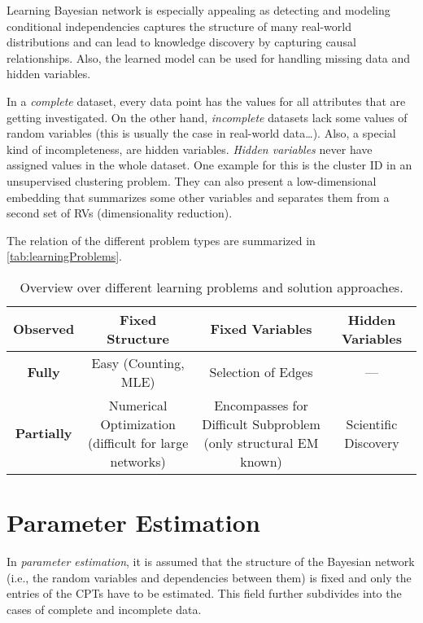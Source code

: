 	Learning Bayesian network is especially appealing as detecting and modeling conditional independencies captures the structure of many real-world distributions and can lead to knowledge discovery by capturing causal relationships. Also, the learned model can be used for handling missing data and hidden variables.

	In a \emph{complete} dataset, every data point has the values for all attributes that are getting investigated. On the other hand, \emph{incomplete} datasets lack some values of random variables (this is usually the case in real-world data\dots). Also, a special kind of incompleteness, are hidden variables. \emph{Hidden variables} never have assigned values in the whole dataset. One example for this is the cluster ID in an unsupervised clustering problem. They can also present a low-dimensional embedding that summarizes some other variables and separates them from a second set of RVs (dimensionality reduction).

	The relation of the different problem types are summarized in \autoref{tab:learningProblems}.

	\begin{table}
		\centering
		\begin{tabular}{c|ccc}
			\toprule
			\textbf{Observed} & \textbf{Fixed Structure} & \textbf{Fixed Variables} & \textbf{Hidden Variables} \\ \midrule
			\textbf{Fully} & Easy (Counting, MLE) & Selection of Edges & --- \\
			\textbf{Partially} & \makecell{Numerical Optimization \\ (difficult for large networks)} & \makecell{Encompasses for Difficult Subproblem \\ (only structural EM known)} & \makecell{Scientific \\ Discovery} \\ \bottomrule
		\end{tabular}
		\caption[Overview Over Different Learning Problems]{Overview over different learning problems and solution approaches.}
		\label{tab:learningProblems}
	\end{table}

	\section{Parameter Estimation}
		In \emph{parameter estimation}, it is assumed that the structure of the Bayesian network (i.e., the random variables and dependencies between them) is fixed and only the entries of the CPTs have to be estimated. This field further subdivides into the cases of complete and incomplete data.

